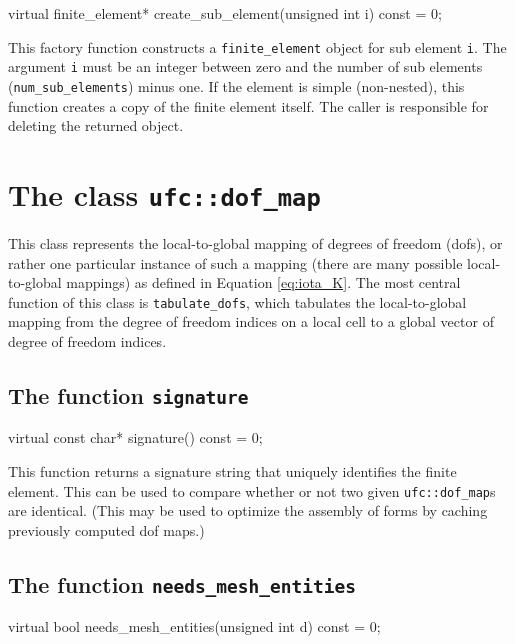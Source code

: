 \begin{code}
virtual finite_element*
create_sub_element(unsigned int i) const = 0;
\end{code}

This factory function constructs a \texttt{finite\_element} object for
sub element \texttt{i}. The argument \texttt{i} must be an integer
between zero and the number of sub elements
(\texttt{num\_sub\_elements}) minus one. If the element is simple
(non-nested), this function creates a copy of the finite element
itself. The caller is responsible for deleting the returned object.

\section{The class \texttt{ufc::dof\_map}}

This class represents the local-to-global mapping of degrees of
freedom (dofs), or rather one particular instance of such a mapping
(there are many possible local-to-global mappings) as defined in
Equation \eqref{eq:iota_K}. The most central function of this class is
\texttt{tabulate\_dofs}, which tabulates the local-to-global mapping
from the degree of freedom indices on a local cell to a global vector of
degree of freedom indices.

\subsection{The function \texttt{signature}}

\begin{code}
virtual const char* signature() const = 0;
\end{code}

This function returns a signature string that uniquely identifies the
finite element. This can be used to compare whether or not two given
\texttt{ufc::dof\_map}s are identical. (This may be used to optimize
the assembly of forms by caching previously computed dof maps.)

\subsection{The function \texttt{needs\_mesh\_entities}}

\begin{code}
virtual bool needs_mesh_entities(unsigned int d) const = 0;
\end{code}

